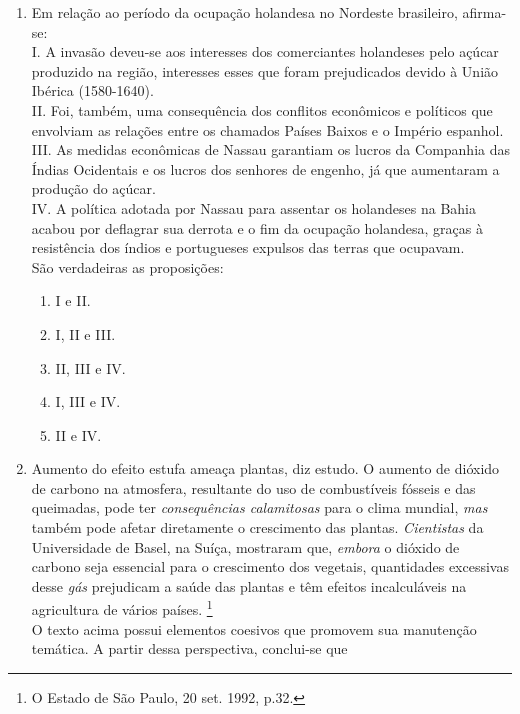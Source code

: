 \documentclass[10pt,a4paper]{article}
\begin{document}
\begin{multicols}{2}
\begin{enumerate}
	\item Em rela\c{c}\~ao ao per\'iodo da ocupa\c{c}\~ao holandesa no Nordeste brasileiro, afirma-se: \\
		I. A invas\~ao deveu-se aos interesses dos comerciantes holandeses pelo a\c{c}\'ucar produzido na regi\~ao, interesses esses que foram prejudicados devido \`a Uni\~ao Ib\'erica (1580-1640). \\
		II. Foi, tamb\'em, uma consequ\^encia dos conflitos econ\^omicos e pol\'iticos que envolviam as rela\c{c}\~oes entre os chamados Pa\'ises Baixos e o Imp\'erio espanhol. \\
		III. As medidas econ\^omicas de Nassau garantiam os lucros da Companhia das \'Indias Ocidentais e os lucros dos senhores de engenho, j\'a que aumentaram a produ\c{c}\~ao do a\c{c}\'ucar. \\
		IV. A pol\'itica adotada por Nassau para assentar os holandeses na Bahia acabou por deflagrar sua derrota e o fim da ocupa\c{c}\~ao holandesa, gra\c{c}as \`a resist\^encia dos \'indios e portugueses expulsos das terras que ocupavam. \\
	S\~ao verdadeiras as proposi\c{c}\~oes: 
		\begin{enumerate}
		\item I e II.
		\item I, II e III.
		\item II, III e IV.
		\item I, III e IV.
		\item II e IV.
		\end{enumerate}






	\item Aumento do efeito estufa amea\c{c}a plantas, diz estudo. O aumento de di\'oxido de carbono na atmosfera, resultante do uso de combust\'iveis f\'osseis e das queimadas, pode ter \emph{consequ\^encias calamitosas} para o clima mundial, \emph{mas} tamb\'em pode afetar diretamente o crescimento das plantas. \emph{Cientistas} da Universidade de Basel, na Su\'i\c{c}a, mostraram que, \emph{embora} o di\'oxido de carbono seja essencial para o crescimento dos vegetais, quantidades excessivas desse \emph{g\'as} prejudicam a sa\'ude das plantas e t\^em efeitos incalcul\'aveis na agricultura de v\'arios pa\'ises. \footnote{O Estado de S\~ao Paulo, 20 set. 1992, p.32. } \\
	O texto acima possui elementos coesivos que promovem sua manuten\c{c}\~ao tem\'atica. A partir dessa perspectiva, conclui-se que 


\end{enumerate}
\end{multicols}
\end{document}
